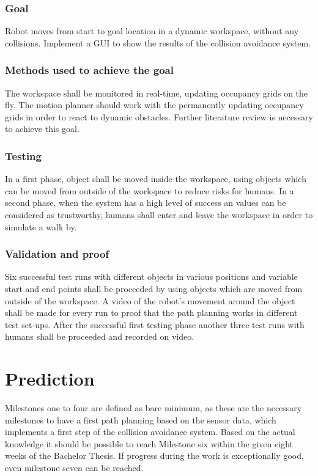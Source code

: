 \subsubsection{Goal}
Robot moves from start to goal location in a dynamic workspace, without any collisions.
Implement a GUI to show the results of the collision avoidance system.

\subsubsection{Methods used to achieve the goal}
The workspace shall be monitored in real-time, updating occupancy grids on the fly. The motion planner should work with the permanently updating occupancy grids in order to react to dynamic obstacles.
Further literature review is necessary to achieve this goal.

\subsubsection{Testing}
In a first phase, object shall be moved inside the workspace, using objects which can be moved from outside of the workspace to reduce risks for humans.
In a second phase, when the system has a high level of success an values can be considered as trustworthy, humans shall enter and leave the workspace in order to simulate a walk by.

\subsubsection{Validation and proof}
Six successful test runs with different objects in various positions and variable start and end points shall be proceeded by using objects which are moved from outside of the workspace.
A video of the robot's movement around the object shall be made for every run to proof that the path planning works in different test set-ups. 
After the successful first testing phase another three test runs with humans shall be proceeded and recorded on video. 

\section{Prediction}

Milestones one to four are defined as bare minimum, as these are the necessary milestones to have a first path planning based on the sensor data, which implements a first step of the collision avoidance system. Based on the actual knowledge it should be possible to reach Milestone six within the given eight weeks of the Bachelor Thesis. If progress during the work is exceptionally good, even milestone seven can be reached.

